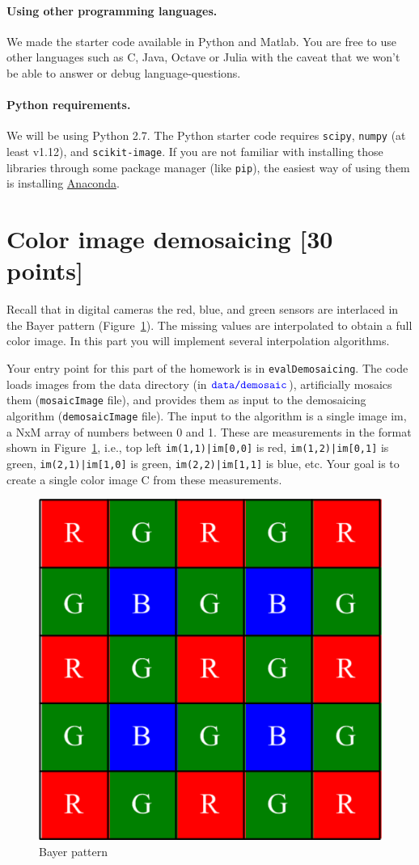 \documentclass[10pt,letterpaper]{article}
\newcommand{\cmd}[1] {{\color{blue}\texttt{#1}}}
\begin{document}
\paragraph{Using other programming languages.} We made the starter code available in Python and Matlab. You are free to use other languages such as C, Java, Octave or Julia with the caveat that we won't be able to answer or debug language-questions.

\paragraph{Python requirements.} We will be using Python 2.7. The Python starter code requires \cmd{scipy}, \cmd{numpy} (at least v1.12), and \cmd{scikit-image}.
If you are not familiar with installing those libraries through some package manager (like \cmd{pip}), the easiest way of using them is installing \href{https://conda.io/docs/user-guide/install/index.html}{Anaconda}.\\


\newpage
\section{Color image demosaicing [30 points]}
Recall that in digital cameras the red, blue, and green sensors are interlaced in the Bayer pattern (Figure~\ref{fig:bayer}). The missing values are interpolated to obtain a full color image. In this part you will implement several interpolation algorithms. 



Your entry point for this part of the homework is in \cmd{evalDemosaicing}. The code loads images from the data directory (in $\cmd{data/demosaic}$), artificially mosaics them (\cmd{mosaicImage} file), and provides them as input to the demosaicing algorithm (\cmd{demosaicImage} file). The input to the algorithm is a single image im, a NxM array of numbers between 0 and 1. These are measurements in the format shown in Figure~\ref{fig:bayer}, i.e., top left \cmd{im(1,1)|im[0,0]} is red, \cmd{im(1,2)|im[0,1]} is green, \cmd{im(2,1)|im[1,0]} is green, \cmd{im(2,2)|im[1,1]} is blue, etc. Your goal is to create a single color image C from these measurements.
\begin{figure}[h]
\centering
\includegraphics[width=0.2\linewidth]{bayer-pattern.png}
\caption{\label{fig:bayer} Bayer pattern}
\end{figure}
\end{document}

